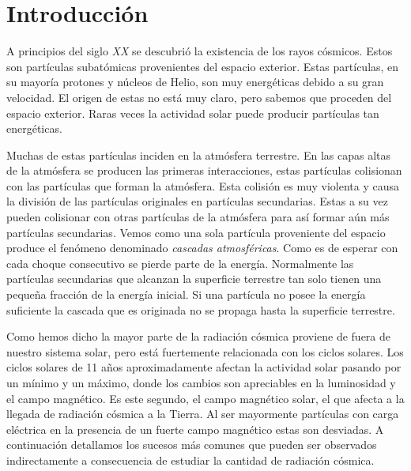 \chapter{Introducción}
\label{cap1}
	A principios del siglo \emph{XX} se descubrió la existencia de los rayos cósmicos. Estos son partículas subatómicas provenientes del espacio
	exterior. Estas partículas, en su mayoría protones y núcleos de Helio, son muy energéticas debido a su gran velocidad. El origen de estas no
	está muy claro, pero sabemos que proceden del espacio exterior. Raras veces la actividad solar puede producir partículas tan energéticas. 
	\par
	Muchas de estas partículas inciden en la atmósfera terrestre. En las capas altas de la atmósfera se producen las primeras interacciones, estas
	partículas colisionan con las partículas que forman la atmósfera. Esta colisión es muy violenta y causa la división de las partículas
	originales en partículas secundarias. Estas a su vez pueden colisionar con otras partículas de la atmósfera para así formar aún más partículas
	secundarias. Vemos como una sola partícula proveniente del espacio produce el fenómeno denominado \emph{cascadas atmosféricas}. Como es de
	esperar con cada choque consecutivo se pierde parte de la energía. Normalmente las partículas secundarias que alcanzan la superficie terrestre
	tan solo tienen una pequeña fracción de la energía inicial. Si una partícula no posee la energía suficiente la cascada que es originada no se
	propaga hasta la superficie terrestre.
	\par
	Como hemos dicho la mayor parte de la radiación cósmica proviene de fuera de nuestro sistema solar, pero está fuertemente relacionada con los
	ciclos solares. Los ciclos solares de 11 años aproximadamente afectan la actividad solar pasando por un mínimo y un máximo, donde los cambios
	son apreciables en la luminosidad y el campo magnético. Es este segundo, el campo magnético solar, el que afecta a la llegada de radiación
	cósmica a la Tierra. Al ser mayormente partículas con carga eléctrica en la presencia de un fuerte campo magnético estas son desviadas. A
	continuación detallamos los sucesos más comunes que pueden ser observados indirectamente a consecuencia de estudiar la cantidad de radiación
	cósmica.
